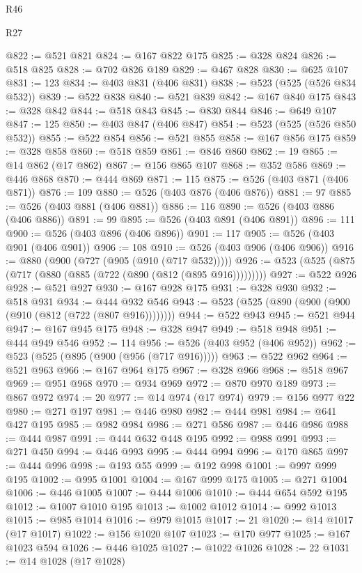 \begin{lexlean}{R46}
\begin{lexlean}{R27}
\begin{coremodule}
{{{{{{{{{{{{{{{{{{{{{{{{{{{{{{{{{{{{{{{{{{{{{{{{{{{{{{{{{{{{{{@822 := @521 @821
@824 := @167 @822 @175
@825 := @328 @824
@826 := @518 @825
@828 := @702 @826 @189
@829 := @467 @828
@830 := @625 @107
@831 := 123
@834 := @403 @831 (@406 @831)
@838 := @523 (@525 (@526 @834 @532))
@839 := @522 @838
@840 := @521 @839
@842 := @167 @840 @175
@843 := @328 @842
@844 := @518 @843
@845 := @830 @844
@846 := @649 @107
@847 := 125
@850 := @403 @847 (@406 @847)
@854 := @523 (@525 (@526 @850 @532))
@855 := @522 @854
@856 := @521 @855
@858 := @167 @856 @175
@859 := @328 @858
@860 := @518 @859
@861 := @846 @860
@862 := 19
@865 := @14 @862 (@17 @862)
@867 := @156 @865 @107
@868 := @352 @586
@869 := @446 @868
@870 := @444 @869
@871 := 115
@875 := @526 (@403 @871 (@406 @871))
@876 := 109
@880 := @526 (@403 @876 (@406 @876))
@881 := 97
@885 := @526 (@403 @881 (@406 @881))
@886 := 116
@890 := @526 (@403 @886 (@406 @886))
@891 := 99
@895 := @526 (@403 @891 (@406 @891))
@896 := 111
@900 := @526 (@403 @896 (@406 @896))
@901 := 117
@905 := @526 (@403 @901 (@406 @901))
@906 := 108
@910 := @526 (@403 @906 (@406 @906))
@916 := @880 (@900 (@727 (@905 (@910 (@717 @532)))))
@926 := @523 (@525 (@875 (@717 (@880 (@885 (@722 (@890 (@812 (@895 @916)))))))))
@927 := @522 @926
@928 := @521 @927
@930 := @167 @928 @175
@931 := @328 @930
@932 := @518 @931
@934 := @444 @932 @546
@943 := @523 (@525 (@890 (@900 (@900 (@910 (@812 (@722 (@807 @916))))))))
@944 := @522 @943
@945 := @521 @944
@947 := @167 @945 @175
@948 := @328 @947
@949 := @518 @948
@951 := @444 @949 @546
@952 := 114
@956 := @526 (@403 @952 (@406 @952))
@962 := @523 (@525 (@895 (@900 (@956 (@717 @916)))))
@963 := @522 @962
@964 := @521 @963
@966 := @167 @964 @175
@967 := @328 @966
@968 := @518 @967
@969 := @951 @968
@970 := @934 @969
@972 := @870 @970 @189
@973 := @867 @972
@974 := 20
@977 := @14 @974 (@17 @974)
@979 := @156 @977 @22
@980 := @271 @197
@981 := @446 @980
@982 := @444 @981
@984 := @641 @427 @195
@985 := @982 @984
@986 := @271 @586
@987 := @446 @986
@988 := @444 @987
@991 := @444 @632 @448 @195
@992 := @988 @991
@993 := @271 @450
@994 := @446 @993
@995 := @444 @994
@996 := @170 @865
@997 := @444 @996
@998 := @193 @55
@999 := @192 @998
@1001 := @997 @999 @195
@1002 := @995 @1001
@1004 := @167 @999 @175
@1005 := @271 @1004
@1006 := @446 @1005
@1007 := @444 @1006
@1010 := @444 @654 @592 @195
@1012 := @1007 @1010 @195
@1013 := @1002 @1012
@1014 := @992 @1013
@1015 := @985 @1014
@1016 := @979 @1015
@1017 := 21
@1020 := @14 @1017 (@17 @1017)
@1022 := @156 @1020 @107
@1023 := @170 @977
@1025 := @167 @1023 @594
@1026 := @446 @1025
@1027 := @1022 @1026
@1028 := 22
@1031 := @14 @1028 (@17 @1028)
}}}}}}}}}}}}}}}}}}}}}}}}}}}}}}}}}}}}}}}}}}}}}}}}}}}}}}}}}}}}}}
\end{coremodule}
\end{lexlean}
\end{lexlean}
